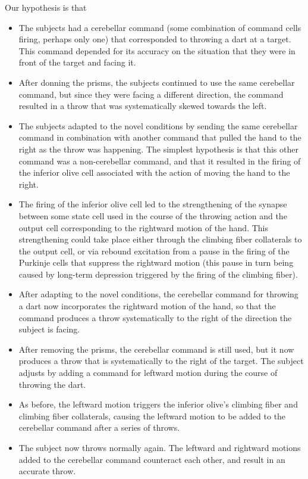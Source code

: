 \documentclass{article}
\theoremstyle{definition}
\begin{document}
Our hypothesis is that
\begin{itemize}
\item The subjects had a cerebellar command (some combination of
  command cells firing, perhaps only one) that corresponded to
  throwing a dart at a target. This command depended for its accuracy
  on the situation that they were in front of the target and facing
  it.
\item After donning the prisms, the subjects continued to use the same
  cerebellar command, but since they were facing a different
  direction, the command resulted in a throw that was systematically
  skewed towards the left.
\item The subjects adapted to the novel conditions by sending the same
  cerebellar command in combination with another command that pulled
  the hand to the right as the throw was happening. The simplest
  hypothesis is that this other command was a non-cerebellar command,
  and that it resulted in the firing of the inferior olive cell
  associated with the action of moving the hand to the right.
\item The firing of the inferior olive cell led to the strengthening
  of the synapse between some state cell used in the course of the
  throwing action and the output cell corresponding to the rightward
  motion of the hand. This strengthening could take place either
  through the climbing fiber collaterals to the output cell, or via
  rebound excitation from a pause in the firing of the Purkinje cells
  that suppress the rightward motion (this pause in turn being caused
  by long-term depression triggered by the firing of the climbing
  fiber).
\item After adapting to the novel conditions, the cerebellar command
  for throwing a dart now incorporates the rightward motion of the
  hand, so that the command produces a throw systematically to the
  right of the direction the subject is facing.
\item After removing the prisms, the cerebellar command is still used,
  but it now produces a throw that is systematically to the right of
  the target. The subject adjusts by adding a command for leftward
  motion during the course of throwing the dart.
\item As before, the leftward motion triggers the inferior olive's
  climbing fiber and climbing fiber collaterals, causing the leftward
  motion to be added to the cerebellar command after a series of
  throws.
\item The subject now throws normally again. The leftward and
  rightward motions added to the cerebellar command counteract each
  other, and result in an accurate throw.
\end{itemize}
\end{document}
